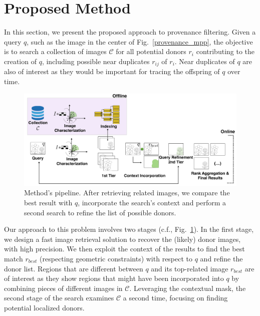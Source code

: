 \section{Proposed Method}
\label{sec:method}
\label{sec:proposedmethod}

In this section, we present the proposed approach to provenance filtering. Given a query $q$, such as the image in the center of Fig.~\ref{provenance_mpp}, the objective is to search a collection of images $\mathcal{C}$ for all potential donors $r_i$ contributing to the creation of $q$, including possible near duplicates $r_{ij}$ of $r_i$. Near duplicates of $q$ are also of interest as they would be important for tracing the offspring of $q$ over time. 

\begin{figure}[t]
	\begin{center}
	\includegraphics[width=0.95\columnwidth]{montage-pipeline-provenance-filtering}
	\caption{Method's pipeline. After retrieving related images, we compare the best result with $q$, incorporate the search's context and perform a second search to refine the list of possible donors.\label{fig:fig2}}	
	\end{center}
\end{figure}

Our approach to this problem involves two stages (c.f., Fig.~\ref{fig:fig2}). In the first stage, we design a fast image retrieval solution to recover the (likely) donor images, with high precision. We then exploit the context of the results to find the best match $r_{best}$ (respecting geometric constraints) with respect to $q$ and refine the donor list. Regions that are different between $q$ and its top-related image $r_{best}$ are of interest as they show regions that might have been incorporated into $q$ by combining pieces of different images in $\mathcal{C}$. Leveraging the contextual mask, the second stage of the search examines $\mathcal{C}$ a second time, focusing on finding potential localized donors. 

